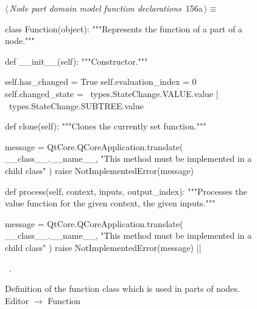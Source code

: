 \documentclass[%
    a4paper,    %
    justified,  %
    nobib,      %
    openany     %
]{tufte-book}
\makeatletter
\renewcommand{\label}[1]{\@tufte@label{##1}}%
\makeatother
\begin{document}
\begin{figure}[!htbp]
\begin{flushleft} \small
\begin{minipage}{\linewidth}\label{scrap116}\raggedright\small
{} $\langle\,${\itshape Node part domain model function declarations}\nobreak\ {\footnotesize {156a}}$\,\rangle\equiv$
\vspace{-1ex}
\begin{pythoncode}
class Function(object):
    """Represents the function of a part of a node."""

    def __init__(self):
        """Constructor."""

        self.has_changed = True
        self.evaluation_index = 0
        self.changed_state = \
            types.StateChange.VALUE.value | \
            types.StateChange.SUBTREE.value

    def clone(self):
        """Clones the currently set function."""

        message = QtCore.QCoreApplication.translate(
            __class__.__name__,
            "This method must be implemented in a child class"
        )
        raise NotImplementedError(message)

    def process(self, context, inputs, output_index):
        """Processes the value function for the given context,
        the given inputs."""

        message = QtCore.QCoreApplication.translate(
            __class__.__name__,
            "This method must be implemented in a child class"
        )
        raise NotImplementedError(message)
|\NWsep|
\end{pythoncode}
\vspace{1.5ex}
\footnotesize
\begin{list}{}{\setlength{\itemsep}{-\parsep}\setlength{\itemindent}{-\leftmargin}}
\item \NWtxtMacroRefIn\ .

\item{}
\end{list}
\end{minipage}\vspace{4ex}
\end{flushleft}
\caption{Definition of the function class which is used in parts of nodes.
  \newline{}\newline{}Editor $\rightarrow$ Function}
\end{figure}
\end{document}
